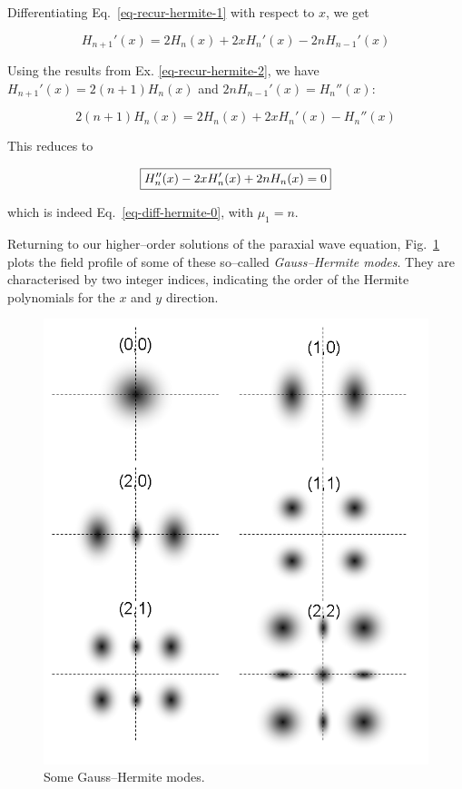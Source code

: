 Differentiating Eq.~\ref{eq-recur-hermite-1} with respect to $x$, we get

\begin{equation}
H_{n+1}'(x) = 2  H_n(x) + 2 x H_n'(x)- 2 n H_{n-1}'(x)
\end{equation} 

Using the results from  Ex. \ref{eq-recur-hermite-2}, we have $H_{n+1}'(x) = 2(n+1)H_n(x)$ and $2 n H_{n-1}'(x) = H_n''(x)$:

\begin{equation}
2(n+1)H_n(x) = 2  H_n(x) + 2 x H_n'(x)- H_n''(x)
\end{equation} 

This reduces to

\begin{equation}
\fbox{$\displaystyle
H_n''(x) - 2 x H_n'(x) + 2n H_n(x) = 0 \label{eq-diff-hermite-1}
$}
\end{equation} 

which is indeed Eq.~\ref{eq-diff-hermite-0}, with $\mu_1=n$.

Returning to our higher--order solutions of the paraxial wave equation, Fig.~\ref{fig-gauss-hermite} plots the field profile of some of these so--called \emph{Gauss--Hermite modes}. They are characterised by two integer indices, indicating the order of the Hermite polynomials for the $x$ and $y$ direction.

\begin{figure}
\centering
\includegraphics[scale=0.5]{special/figures/gauss}
\caption{Some Gauss--Hermite modes.}
\label{fig-gauss-hermite}
\end{figure}

